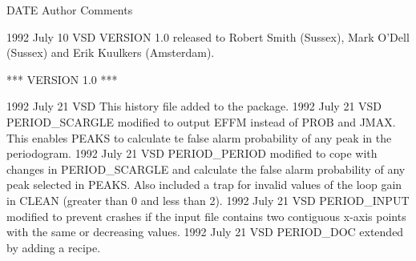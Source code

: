 \documentclass[twoside,11pt,noabs,nolof]{starlink}
\begin{document}
\begin{small}
\begin{terminalv}

   DATE       Author            Comments

1992 July 10   VSD       VERSION 1.0 released to Robert Smith (Sussex),
                         Mark O'Dell (Sussex) and Erik Kuulkers (Amsterdam).

                         *** VERSION 1.0 ***

1992 July 21   VSD       This history file added to the package.
1992 July 21   VSD       PERIOD_SCARGLE modified to output EFFM instead of
                         PROB and JMAX. This enables PEAKS to calculate te
                         false alarm probability of any peak in the
                         periodogram.
1992 July 21   VSD       PERIOD_PERIOD modified to cope with changes in
                         PERIOD_SCARGLE and calculate the false alarm
                         probability of any peak selected in PEAKS.
                         Also included a trap for invalid values of the
                         loop gain in CLEAN (greater than 0 and less than 2).
1992 July 21   VSD       PERIOD_INPUT modified to prevent crashes if the
                         input file contains two contiguous x-axis points
                         with the same or decreasing values.
1992 July 21   VSD       PERIOD_DOC extended by adding a recipe.

\end{terminalv}
\end{small}


\newpage
\end{document}
